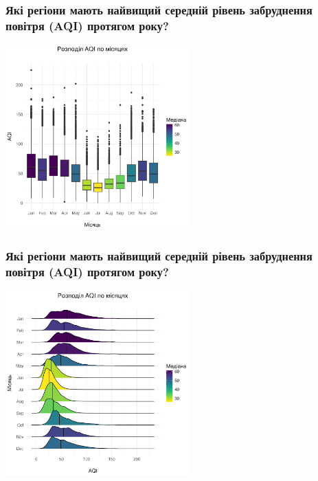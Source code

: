 \documentclass{beamer}
\begin{document}
\begin{frame}
  \frametitle{Які регіони мають найвищий середній рівень забруднення повітря (AQI) протягом року?}

  \begin{center}
    \includegraphics[height=2.8in]{plots/question4/seasonal_change.png}
  \end{center}
\end{frame}

\begin{frame}
  \frametitle{Які регіони мають найвищий середній рівень забруднення повітря (AQI) протягом року?}

  \begin{center}
    \includegraphics[height=2.8in]{plots/question4/seasonal_change_ridgeline.png}
  \end{center}
\end{frame}

\end{document}
